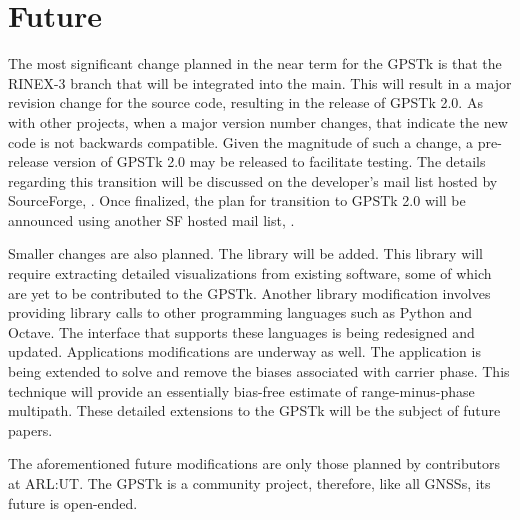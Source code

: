 \section*{Future}

The most significant change planned in the near term for the GPSTk is
that the RINEX-3 branch that will be integrated into the main. This
will result in a major revision change for the source code, resulting
in the release of GPSTk 2.0. As with other projects, when a major
version number changes, that indicate the new code is not backwards
compatible. Given the magnitude of such a change, a pre-release
version of GPSTk 2.0 may be released to facilitate testing. The
details regarding this transition will be discussed on the developer's
mail list hosted by SourceForge,
. Once finalized, the
plan for transition to GPSTk 2.0 will be announced using another SF
hosted mail list, .

Smaller changes are also planned. The  library
will be added. This library will require extracting detailed
visualizations from existing software, some of which are yet to be
contributed to the GPSTk. Another library modification involves
providing library calls to other programming languages such as
Python and Octave. The interface that supports these languages is
being redesigned and updated. Applications modifications are
underway as well. The  application is being
extended to solve and remove the biases associated with carrier phase.  This
technique will provide an essentially bias-free estimate of
range-minus-phase multipath. These detailed extensions to the GPSTk
will be the subject of future papers. 

The aforementioned future modifications are only those planned by
contributors at ARL:UT. The GPSTk is a community project, therefore,
like all GNSSs, its future is open-ended.
